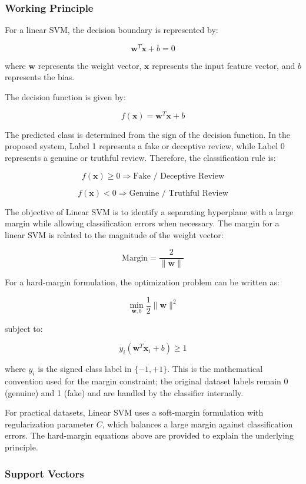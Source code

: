 \documentclass[12pt,a4paper]{report}
\begin{document}
\subsubsection*{Working Principle}

For a linear SVM, the decision boundary is represented by:

\[
\mathbf{w}^{T}\mathbf{x}+b=0
\]

where \(\mathbf{w}\) represents the weight vector, \(\mathbf{x}\) represents the input feature vector, and \(b\) represents the bias.

The decision function is given by:

\[
f(\mathbf{x})=\mathbf{w}^{T}\mathbf{x}+b
\]

The predicted class is determined from the sign of the decision function. In the proposed system, Label 1 represents a fake or deceptive review, while Label 0 represents a genuine or truthful review. Therefore, the classification rule is:

\[
f(\mathbf{x}) \geq 0
\Rightarrow \text{Fake / Deceptive Review}
\]

\[
f(\mathbf{x}) < 0
\Rightarrow \text{Genuine / Truthful Review}
\]

The objective of Linear SVM is to identify a separating hyperplane with a large margin while allowing classification errors when necessary. The margin for a linear SVM is related to the magnitude of the weight vector:

\[
\text{Margin}=\frac{2}{\|\mathbf{w}\|}
\]

For a hard-margin formulation, the optimization problem can be written as:

\[
\min_{\mathbf{w},b}
\frac{1}{2}\|\mathbf{w}\|^2
\]

subject to:

\[
y_i(\mathbf{w}^{T}\mathbf{x}_i+b)\geq1
\]

where \(y_i\) is the signed class label in \(\{-1,+1\}\). This is the mathematical convention used for the margin constraint; the original dataset labels remain 0 (genuine) and 1 (fake) and are handled by the classifier internally.

For practical datasets, Linear SVM uses a soft-margin formulation with regularization parameter \(C\), which balances a large margin against classification errors. The hard-margin equations above are provided to explain the underlying principle.

\subsubsection*{Support Vectors}
\end{document}
